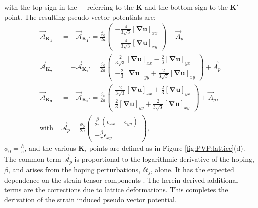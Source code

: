 with the top sign in the $\pm$ referring to the $\bm{K}$ and the bottom sign to the $\bm{K'}$ point.
The resulting pseudo vector potentials are:
\begin{align}
  \vec{\mathcal{A}}_{\bm{K_1}}&=-\vec{\mathcal{A}}_{\bm{K_1'}}=
    \frac{\phi_0}{2a} \left( \begin{array}{c} 
      -\frac{4}{3\sqrt{3}} [\bm{\nabla u}]_{xx} \\ 
      -\frac{4}{3\sqrt{3}} [\bm{\nabla u}]_{xy}
    \end{array} \right) +\vec{A}_p \nonumber \\ 
  \vec{\mathcal{A}}_{\bm{K_2}}&=-\vec{\mathcal{A}}_{\bm{K_2'}}=
    \frac{\phi_0}{2a} \left( \begin{array}{c} 
      \frac{2}{3\sqrt{3}}[\bm{\nabla u}]_{xx}-\frac{2}{3} [\bm{\nabla u}]_{yx} \\
      -\frac{2}{3} [\bm{\nabla u}]_{yy}+\frac{2}{3 \sqrt{3}} [\bm{\nabla u}]_{xy}
    \end{array} \right)+\vec{A}_p  \nonumber \\
  \vec{\mathcal{A}}_{\bm{K_3}}&=-\vec{\mathcal{A}}_{\bm{K_3'}}=
    \frac{\phi_0}{2a} \left( \begin{array}{c}
      \frac{2}{3\sqrt{3}}[\bm{\nabla u}]_{xx}+\frac{2}{3} [\bm{\nabla u}]_{yx} \\
      \frac{2}{3} [\bm{\nabla u}]_{yy}+\frac{2}{3 \sqrt{3}} [\bm{\nabla u}]_{xy}
    \end{array} \right)+\vec{A}_p  , \nonumber \\
  \textrm{with }
  &\vec{\mathcal{A}}_p= 
    \frac{\phi_0}{2a} \left( \begin{array}{c} 
      \frac{\beta }{2 \pi} (\epsilon_{xx}-\epsilon_{yy}) \\
      -\frac{\beta}{\pi} \epsilon_{xy}
    \end{array} \right),
  \label{eq:PVP:PVP}
\end{align}
$\phi_0=\frac{h}{e}$, and the various $\bm{K}_i$ points are defined as in Figure \ref{fig:PVP:lattice}(d).
The common term $\vec{\mathcal{A}}_p$ is proportional to the logarithmic derivative of the hoping, $\beta$, and arises from the hoping perturbations, $\delta t_j$, alone.
It has the expected dependence on the strain tensor components \cite{CastroNeto2009,Vozmediano2010}. 
The herein derived additional terms are the corrections due to lattice deformations.
This completes the derivation of the strain induced pseudo vector potential.

